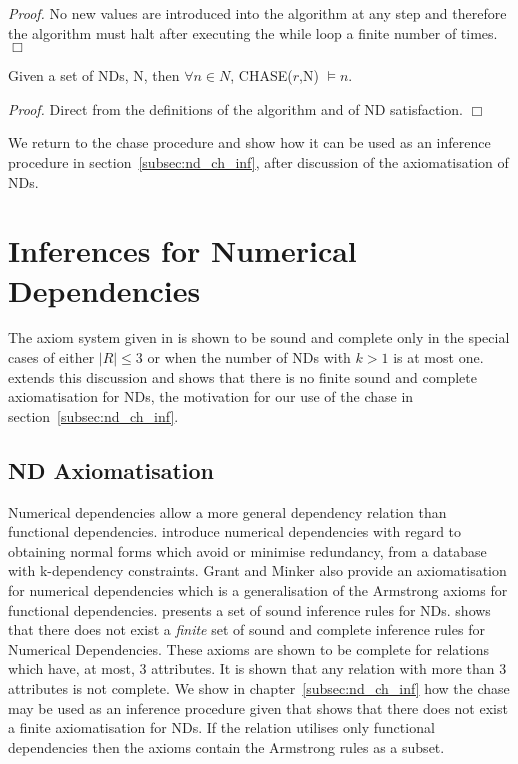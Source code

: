 {\em Proof.} No new values are introduced into the algorithm at any
step and therefore the algorithm must halt after executing the while
loop a finite number of times. $\Box$

\begin{theorem}\label{th:chase}
\begin{rm}
Given a set of NDs, N, then $\forall n \in N$, CHASE($r$,N) $\models n$.
\end{rm}
\end{theorem}

{\em Proof.} Direct from the definitions of the algorithm and of ND
satisfaction. $\Box$

We return to the chase procedure and show how it can be used as an
inference procedure in section~\ref{subsec:nd_ch_inf}, after discussion of the
axiomatisation of NDs.   

\section{Inferences for Numerical Dependencies}\label{sec:nd_inf}

The axiom system given in \cite{gm85a} is shown to be sound and
complete only in the special cases of either $|R| \le 3$ or when the number of
NDs with $k > 1$ is at most one. \cite{gm85b} extends this discussion
and shows that there is no finite sound and complete
axiomatisation for NDs, the motivation for our use of the chase in
section~\ref{subsec:nd_ch_inf}. 

\subsection{ND Axiomatisation}\label{subsec:nd_axiom}

Numerical dependencies allow a more general dependency relation than functional
dependencies.  \cite{gm85a,gm85b} introduce numerical dependencies with regard
to obtaining normal forms which avoid or minimise redundancy, from a database with k-dependency constraints. Grant and Minker also provide an axiomatisation for numerical dependencies which is a generalisation of the Armstrong axioms for
functional dependencies. \cite{gm85a} presents a set of sound inference rules for NDs. \cite{gm85b}
shows that there does not exist a {\em finite} set of sound and
complete inference rules for Numerical Dependencies.
These axioms are shown to be complete for relations which have, at most,
3 attributes.  It is shown that any relation with more than 3 attributes is
not complete. We show in chapter~\ref{subsec:nd_ch_inf} how the chase may
be used as an inference procedure given that \cite{gm85a} shows that
there does not exist a finite axiomatisation for NDs.
If the relation utilises only functional dependencies then the axioms
contain the Armstrong rules as a subset.\\

